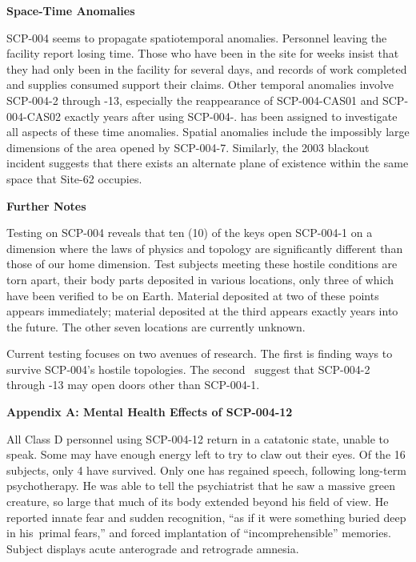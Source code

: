 \begin{flushleft}
\textbf{Space-Time Anomalies}
\end{flushleft}

SCP-004 seems to propagate spatiotemporal anomalies. Personnel leaving the facility report losing time. Those who have been in the site for weeks insist that they had only been in the facility for several days, and records of work completed and supplies consumed support their claims. Other temporal anomalies involve SCP-004-2 through -13, especially the reappearance of SCP-004-CAS01 and SCP-004-CAS02 exactly  years after using SCP-004-.  has been assigned to investigate all aspects of these time anomalies. Spatial anomalies include the impossibly large dimensions of the area opened by SCP-004-7. Similarly, the 2003 blackout incident suggests that there exists an alternate plane of existence within the same space that Site-62 occupies.

\begin{flushleft}
\textbf{Further Notes}
\end{flushleft}

Testing on SCP-004 reveals that ten (10) of the keys open SCP-004-1 on a dimension where the laws of physics and topology are significantly different than those of our home dimension. Test subjects meeting these hostile conditions are torn apart, their body parts deposited in various locations, only three of which have been verified to be on Earth. Material deposited at two of these points appears immediately; material deposited at the third appears exactly  years into the future. The other seven locations are currently unknown.

Current testing focuses on two avenues of research. The first is finding ways to survive SCP-004’s hostile topologies. The second \expunged \ suggest that SCP-004-2 through -13 may open doors other than SCP-004-1.

\begin{flushleft}
\textbf{Appendix A: Mental Health Effects of SCP-004-12}
\end{flushleft}

All Class D personnel using SCP-004-12 return in a catatonic state, unable to speak. Some may have enough energy left to try to claw out their eyes. Of the 16 subjects, only 4 have survived. Only one has regained speech, following long-term psychotherapy. He was able to tell the psychiatrist that he saw a massive green creature, so large that much of its body extended beyond his field of view. He reported innate fear and sudden recognition, “as if it were something buried deep in \lb his\rb \ primal fears,” and forced implantation of “incomprehensible” memories. Subject displays acute anterograde and retrograde amnesia.

